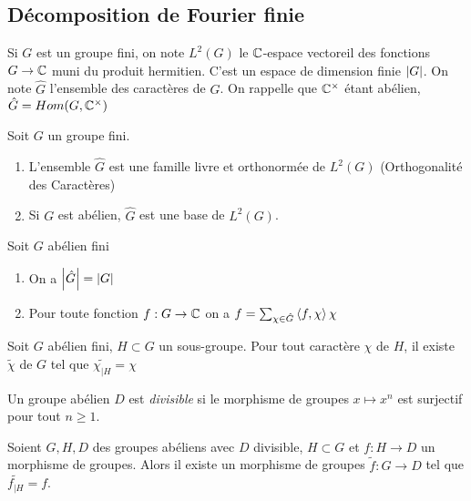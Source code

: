 \documentclass{cours}
\begin{document}
\subsection{Décomposition de Fourier finie}
\begin{definition}
    Si $G$ est un groupe fini, on note $L^{2}(G)$ le $\mathbb{C}$-espace vectoreil des fonctions $G \rightarrow \mathbb{C}$ muni du produit hermitien. C'est un espace de dimension finie $\left|G\right|$. On note $\hat{G}$ l'ensemble des caractères de $G$. On rappelle que $\mathbb{C}^{\times}$ étant abélien, $\hat{G} = Hom(G, \mathbb{C}^{\times})$
\end{definition}

\begin{theorem}
    Soit $G$ un groupe fini.
    \begin{enumerate}
        \item L'ensemble $\hat{G}$ est une famille livre et orthonormée de $L^{2}(G)$ (Orthogonalité des Caractères)
        \item Si $G$ est abélien, $\hat{G}$ est une base de $L^{2}(G)$.
    \end{enumerate}
\end{theorem}

\begin{corollary}
    Soit $G$ abélien fini
    \begin{enumerate}
        \item On a $\left|\hat{G}\right| = \left|G\right|$
        \item Pour toute fonction $f : G \rightarrow \mathbb{C}$ on a $f = \sum_{\chi \in \hat{G}} \left\langle f, \chi \right\rangle \chi$
    \end{enumerate}
\end{corollary}

\begin{proposition}
    Soit $G$ abélien fini, $H \subset G$ un sous-groupe. Pour tout caractère $\chi$ de $H$, il existe $\tilde{\chi}$ de $G$ tel que $\tilde{\chi_{\mid H}} = \chi$
\end{proposition}

\begin{definition}
    Un groupe abélien $D$ est \emph{divisible} si le morphisme de groupes $x \mapsto x^{n}$ est surjectif pour tout $n \geq 1$.
\end{definition}

\begin{proposition}
    Soient $G, H, D$ des groupes abéliens avec $D$ divisible, $H \subset G$ et $f : H \rightarrow D$ un morphisme de groupes. Alors il existe un morphisme de groupes $\tilde{f} : G \rightarrow D$ tel que $\tilde{f_{\mid H}} = f$.
\end{proposition}
\end{document}

